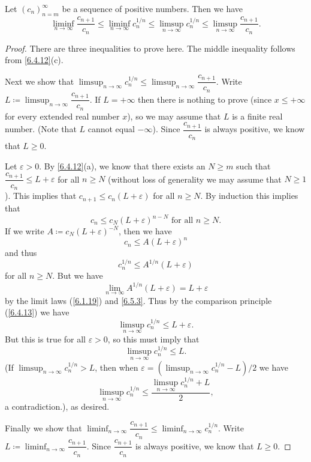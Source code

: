 \begin{lem}\label{7.5.2}
  Let \((c_n)_{n = m}^\infty\) be a sequence of positive numbers.
  Then we have
  \[
    \liminf_{n \to \infty} \dfrac{c_{n + 1}}{c_n} \leq \liminf_{n \to \infty} c_n^{1 / n} \leq \limsup_{n \to \infty} c_n^{1 / n} \leq \limsup_{n \to \infty} \dfrac{c_{n + 1}}{c_n}.
  \]
\end{lem}

\begin{proof}
  There are three inequalities to prove here.
  The middle inequality follows from \cref{6.4.12}(c).

  Next we show that \(\limsup_{n \to \infty} c_n^{1 / n} \leq \limsup_{n \to \infty} \dfrac{c_{n + 1}}{c_n}\).
  Write \(L \coloneqq \limsup_{n \to \infty} \dfrac{c_{n + 1}}{c_n}\).
  If \(L = +\infty\) then there is nothing to prove (since \(x \leq +\infty\) for every extended real number \(x\)), so we may assume that \(L\) is a finite real number.
  (Note that \(L\) cannot equal \(-\infty\)).
  Since \(\dfrac{c_{n + 1}}{c_n}\) is always positive, we know that \(L \geq 0\).

  Let \(\varepsilon > 0\).
  By \cref{6.4.12}(a), we know that there exists an \(N \geq m\) such that \(\dfrac{c_{n + 1}}{c_n} \leq L + \varepsilon\) for all \(n \geq N\)
  (without loss of generality we may assume that \(N \geq 1\)).
  This implies that \(c_{n + 1} \leq c_n (L + \varepsilon)\) for all \(n \geq N\).
  By induction this implies that
  \[
    c_n \leq c_N (L + \varepsilon)^{n - N} \text{ for all } n \geq N.
  \]
  If we write \(A \coloneqq c_N (L + \varepsilon)^{-N}\), then we have
  \[
    c_n \leq A(L + \varepsilon)^n
  \]
  and thus
  \[
    c_n^{1 / n} \leq A^{1 / n} (L + \varepsilon)
  \]
  for all \(n \geq N\).
  But we have
  \[
    \lim_{n \to \infty} A^{1 / n} (L + \varepsilon) = L + \varepsilon
  \]
  by the limit laws (\cref{6.1.19}) and \cref{6.5.3}.
  Thus by the comparison principle (\cref{6.4.13}) we have
  \[
    \limsup_{n \to \infty} c_n^{1 / n} \leq L + \varepsilon.
  \]
  But this is true for all \(\varepsilon > 0\), so this must imply that
  \[
    \limsup_{n \to \infty} c_n^{1 / n} \leq L.
  \]
  (If \(\limsup_{n \to \infty} c_n^{1 / n} > L\), then when \(\varepsilon = (\limsup_{n \to \infty} c_n^{1 / n} - L) / 2\) we have
  \[
    \limsup_{n \to \infty} c_n^{1 / n} \leq \dfrac{\limsup_{n \to \infty} c_n^{1 / n} + L}{2},
  \]
  a contradiction.), as desired.

  Finally we show that \(\liminf_{n \to \infty} \dfrac{c_{n + 1}}{c_n} \leq \liminf_{n \to \infty} c_n^{1 / n}\).
  Write \(L \coloneqq \liminf_{n \to \infty} \dfrac{c_{n + 1}}{c_n}\).
  Since \(\dfrac{c_{n + 1}}{c_n}\) is always positive, we know that \(L \geq 0\).


\end{proof}
